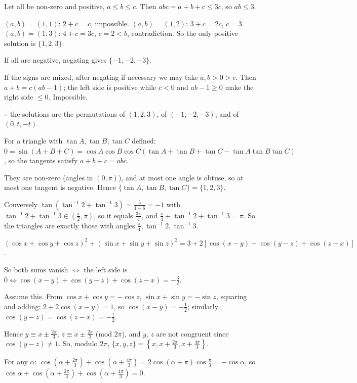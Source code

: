   Let all be non-zero and positive, $a\leq b\leq c$. Then $abc = a + b + c\leq 3c$, so $ab\leq 3$.

  $(a, b) = (1, 1)$: $2 + c = c$, impossible. $(a, b) = (1, 2)$: $3 + c = 2c$, $c = 3$. $(a, b) = (1, 3)$: $4 + c =
  3c$, $c = 2 < b$, contradiction. So the only positive solution is $\{1, 2, 3\}$.

  If all are negative, negating gives $\{-1, -2, -3\}$.

  If the signs are mixed, after negating if necessary we may take $a, b > 0 > c$. Then $a + b = c(ab - 1)$; the
  left side is positive while $c < 0$ and $ab - 1\geq 0$ make the right side $\leq 0$. Impossible.

  $\therefore$ the solutions are the permutations of $(1, 2, 3)$, of $(-1, -2, -3)$, and of $(0, t, -t)$.

  For a triangle with $\tan A, \tan B, \tan C$ defined: $0 = \sin(A + B + C) = \cos A\cos B\cos C(\tan A + \tan B +
  \tan C - \tan A\tan B\tan C)$, so the tangents satisfy $a + b + c = abc$.

  They are non-zero (angles in $(0, \pi)$), and at most one angle is obtuse, so at most one tangent is negative.
  Hence $\{\tan A, \tan B, \tan C\} = \{1, 2, 3\}$.

  Conversely $\tan(\tan^{-1}2 + \tan^{-1}3) = \frac{5}{1 - 6} = -1$ with $\tan^{-1}2 + \tan^{-1}3\in\left(\frac{\pi}{2},
  \pi\right)$, so it equals $\frac{3\pi}{4}$, and $\frac{\pi}{4} + \tan^{-1}2 + \tan^{-1}3 = \pi$. So the triangles
  are exactly those with angles $\frac{\pi}{4}, \tan^{-1}2, \tan^{-1}3$.
\item $(\cos x + \cos y + \cos z)^2 + (\sin x + \sin y + \sin z)^2 = 3 + 2[\cos(x - y) + \cos(y - z) + \cos(z -
  x)]$.

  So both sums vanish $\iff$ the left side is $0\iff\cos(x - y) + \cos(y - z) + \cos(z - x) = -\frac{3}{2}$.

  Assume this. From $\cos x + \cos y = -\cos z$, $\sin x + \sin y = -\sin z$, squaring and adding: $2 + 2\cos(x -
  y) = 1$, so $\cos(x - y) = -\frac{1}{2}$; similarly $\cos(y - z) = \cos(z - x) = -\frac{1}{2}$.

  Hence $y\equiv x\pm\frac{2\pi}{3}$, $z\equiv x\pm\frac{2\pi}{3}$ (mod $2\pi$), and $y$, $z$ are not congruent since $\cos(y -
  z)\neq 1$. So, modulo $2\pi$, $\{x, y, z\} = \left\{x, x + \frac{2\pi}{3}, x + \frac{4\pi}{3}\right\}$.

  For any $\alpha$: $\cos\left(\alpha + \frac{2\pi}{3}\right) + \cos\left(\alpha + \frac{4\pi}{3}\right) =
  2\cos(\alpha + \pi)\cos\frac{\pi}{3} = -\cos\alpha$, so $\cos\alpha + \cos\left(\alpha + \frac{2\pi}{3}\right)
  + \cos\left(\alpha + \frac{4\pi}{3}\right) = 0$.

